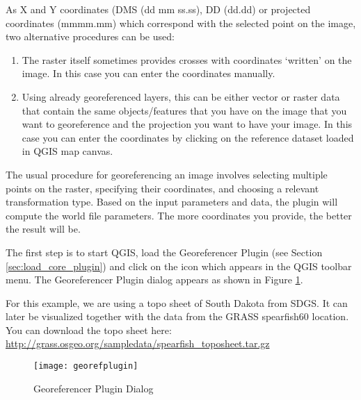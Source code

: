 
As X and Y coordinates (DMS (dd mm ss.ss), DD (dd.dd) or projected coordinates 
(mmmm.mm) which correspond with the selected point on the image, two 
alternative procedures can be used: 

\begin{enumerate}
\item The raster itself sometimes provides crosses with coordinates 
`written' on the image. In this case you can enter the coordinates manually.
\item Using already georeferenced layers, this can be either vector or 
raster data that contain the same objects/features that you have on 
the image that you want to georeference and the projection you want to 
have your image. In this case you can enter the coordinates by 
clicking on the reference dataset loaded in QGIS map canvas.
\end{enumerate}

The usual procedure for georeferencing an image involves selecting multiple 
points on the raster, specifying their coordinates, and choosing a relevant 
transformation type. Based on the input parameters and data, the plugin will 
compute the world file parameters. The more coordinates you provide, the 
better the result will be.

The first step is to start QGIS, load the Georeferencer Plugin (see Section 
\ref{sec:load_core_plugin}) and click on the 
 icon which appears in the 
QGIS toolbar menu. The Georeferencer Plugin dialog appears as shown 
in Figure \ref{fig:georefplugin}.
  
For this example, we are using a topo sheet of South Dakota from SDGS. 
It can later be visualized together with the data from the GRASS spearfish60 
location. You can download the topo sheet here: 
\url{http://grass.osgeo.org/sampledata/spearfish\_toposheet.tar.gz}

\begin{figure}[ht]
\centering
  \texttt{[image: georefplugin]}
  \caption{Georeferencer Plugin Dialog \nixcaption}\label{fig:georefplugin}
\end{figure}

\label{georeferencer_entering}


